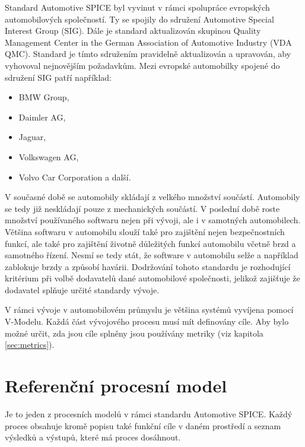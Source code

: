 \documentclass[czech,master]{diploma}
\begin{document}
Standard Automotive SPICE byl vyvinut v rámci spolupráce evropských automobilových společností. Ty se spojily do sdružení Automotive Special Interest Group (SIG). Dále je standard aktualizován skupinou Quality Management Center in the German Association of Automotive Industry (VDA QMC). Standard je tímto sdružením pravidelně aktualizován a upravován, aby vyhovoval nejnovějším požadavkům. Mezi evropské automobilky spojené do sdružení SIG patří například:

\begin{itemize}
  \item BMW Group,
  \item Daimler AG,
  \item Jaguar,
  \item Volkswagen AG,
  \item Volvo Car Corporation a další.
\end{itemize}

V současné době se automobily skládají z velkého množství součástí. Automobily se tedy již neskládají pouze z mechanických součástí. V poslední době roste množství používaného softwaru nejen při vývoji, ale i v samotných automobilech. Většina softwaru v automobilu slouží také pro zajištění nejen bezpečnostních funkcí, ale také pro zajištění životně důležitých funkcí automobilu včetně brzd a samotného řízení. Nesmí se tedy stát, že software v automobilu selže a například zablokuje brzdy a způsobí havárii. Dodržování tohoto standardu je rozhodující kritérium při volbě dodavatelů dané automobilové společnosti, jelikož zajišťuje že dodavatel splňuje určité standardy vývoje.

V rámci vývoje v automobilovém průmyslu je většina systémů vyvíjena pomocí V-Modelu. Každá část  vývojového procesu musí mít definovány cíle. Aby bylo možné určit, zda jsou cíle splněny jsou používány metriky (viz kapitola \ref{sec:metrics}).

\section{Referenční procesní model}
Je to jeden z procesních modelů v rámci standardu Automotive SPICE.
Každý proces obsahuje kromě popisu také funkční cíle v daném prostředí a seznam výsledků a výstupů, které má proces dosáhnout.
\cite{ref:aspice_download_procesni_modely}
\end{document}
